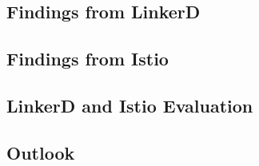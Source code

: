 \subsection{Findings from LinkerD}

\subsection{Findings from Istio}

\subsection{LinkerD and Istio Evaluation}

\subsection{Outlook}
